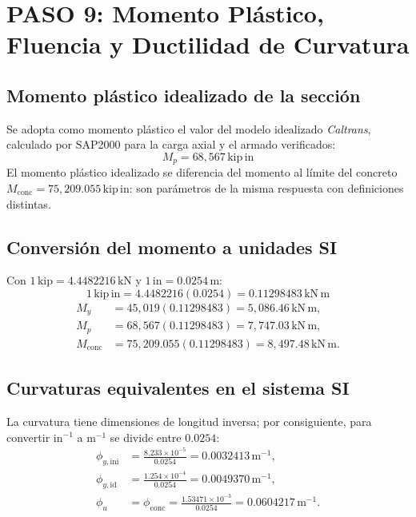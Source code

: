 \documentclass[11pt,a4paper]{article}
\begin{document}
\section{PASO 9: Momento Plástico, Fluencia y Ductilidad de Curvatura}

\subsection{Momento plástico idealizado de la sección}
Se adopta como momento plástico el valor del modelo idealizado
\textit{Caltrans}, calculado por SAP2000 para la carga axial y el armado
verificados:
\begin{equation*}
\boxed{M_p=68{,}567\,\mathrm{kip\,in}}
\end{equation*}
El momento plástico idealizado se diferencia del momento al límite del
concreto $M_{\mathrm{conc}}=75{,}209.055\,\mathrm{kip\,in}$:
son parámetros de la misma respuesta con definiciones distintas.

\subsection{Conversión del momento a unidades SI}
Con $1\,\mathrm{kip}=4.4482216\,\mathrm{kN}$ y
$1\,\mathrm{in}=0.0254\,\mathrm{m}$:
\begin{equation*}
1\,\mathrm{kip\,in}=4.4482216(0.0254)
=0.11298483\,\mathrm{kN\,m}
\end{equation*}
\begin{align*}
M_y &=45{,}019(0.11298483)
      =\boxed{5{,}086.46\,\mathrm{kN\,m}},\\[2pt]
M_p &=68{,}567(0.11298483)
      =\boxed{7{,}747.03\,\mathrm{kN\,m}},\\[2pt]
M_{\mathrm{conc}}&=75{,}209.055(0.11298483)
      =\boxed{8{,}497.48\,\mathrm{kN\,m}}.
\end{align*}

\subsection{Curvaturas equivalentes en el sistema SI}
La curvatura tiene dimensiones de longitud inversa; por consiguiente,
para convertir $\mathrm{in}^{-1}$ a $\mathrm{m}^{-1}$ se divide entre
$0.0254$:
\begin{align*}
\phi_{y,\mathrm{ini}}&=\frac{8.233\times10^{-5}}{0.0254}
  =0.0032413\,\mathrm{m}^{-1},\\
\phi_{y,\mathrm{id}}&=\frac{1.254\times10^{-4}}{0.0254}
  =0.0049370\,\mathrm{m}^{-1},\\
\phi_{u}&=\phi_{\mathrm{conc}}=
\frac{1.53471\times10^{-3}}{0.0254}
  =0.0604217\,\mathrm{m}^{-1}.
\end{align*}
\end{document}
